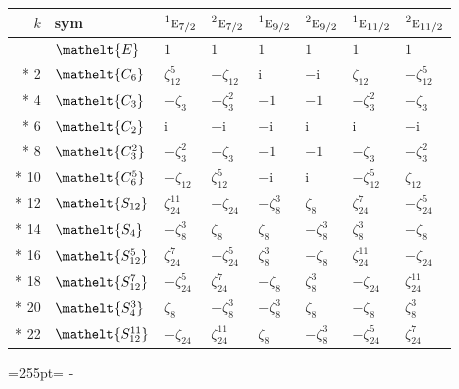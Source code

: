 \documentclass[10pt,a4paper]{article}
\newcommand{\needspace}[1]{\par\penalty-100\begingroup\dimen0=#1\relax\dimen2=\pagegoal
  \advance\dimen2-\pagetotal\ifdim\dimen0>\dimen2\relax\ifdim\dimen2>0pt\vfil\break\fi\fi
  \endgroup}
\numberwithin{equation}{section}
\newcommand{\eltfont}[1]{{\let\sigma\eltsigma\mathelt{#1}}}
\newcommand{\irr}[1]{\text{\normalfont\scshape #1}}
\newcommand{\conjpair}[1]{{}^{#1}}
\newcommand{\cls}[1]{\eltfont{#1}}
\newcommand{\iunit}{\mathrm{i}}
\newcommand{\rootunity}[1]{\zeta_{#1}}
\begin{document}
{\small\setlength{\tabcolsep}{4pt}
\begin{longtable}{@{}rlllllll@{}}\toprule
$k$ & sym & $\conjpair{1}\irr{e}_{7/2}$ & $\conjpair{2}\irr{e}_{7/2}$ & $\conjpair{1}\irr{e}_{9/2}$ & $\conjpair{2}\irr{e}_{9/2}$ & $\conjpair{1}\irr{e}_{11/2}$ & $\conjpair{2}\irr{e}_{11/2}$\\\midrule\endhead
\bottomrule\endfoot\endlastfoot
0 & $\cls{E}$ & $1$ & $1$ & $1$ & $1$ & $1$ & $1$\\*
2 & $\cls{C_{6}}$ & $\rootunity{12}^{5}$ & $-\rootunity{12}$ & $\iunit{}$ & $-\iunit{}$ & $\rootunity{12}$ & $-\rootunity{12}^{5}$\\*
4 & $\cls{C_{3}}$ & $-\rootunity{3}$ & $-\rootunity{3}^{2}$ & $-1$ & $-1$ & $-\rootunity{3}^{2}$ & $-\rootunity{3}$\\*
6 & $\cls{C_{2}}$ & $\iunit{}$ & $-\iunit{}$ & $-\iunit{}$ & $\iunit{}$ & $\iunit{}$ & $-\iunit{}$\\*
8 & $\cls{C_{3}^{2}}$ & $-\rootunity{3}^{2}$ & $-\rootunity{3}$ & $-1$ & $-1$ & $-\rootunity{3}$ & $-\rootunity{3}^{2}$\\*
10 & $\cls{C_{6}^{5}}$ & $-\rootunity{12}$ & $\rootunity{12}^{5}$ & $-\iunit{}$ & $\iunit{}$ & $-\rootunity{12}^{5}$ & $\rootunity{12}$\\*
12 & $\cls{S_{12}}$ & $\rootunity{24}^{11}$ & $-\rootunity{24}$ & $-\rootunity{8}^{3}$ & $\rootunity{8}$ & $\rootunity{24}^{7}$ & $-\rootunity{24}^{5}$\\*
14 & $\cls{S_{4}}$ & $-\rootunity{8}^{3}$ & $\rootunity{8}$ & $\rootunity{8}$ & $-\rootunity{8}^{3}$ & $\rootunity{8}^{3}$ & $-\rootunity{8}$\\*
16 & $\cls{S_{12}^{5}}$ & $\rootunity{24}^{7}$ & $-\rootunity{24}^{5}$ & $\rootunity{8}^{3}$ & $-\rootunity{8}$ & $\rootunity{24}^{11}$ & $-\rootunity{24}$\\*
18 & $\cls{S_{12}^{7}}$ & $-\rootunity{24}^{5}$ & $\rootunity{24}^{7}$ & $-\rootunity{8}$ & $\rootunity{8}^{3}$ & $-\rootunity{24}$ & $\rootunity{24}^{11}$\\*
20 & $\cls{S_{4}^{3}}$ & $\rootunity{8}$ & $-\rootunity{8}^{3}$ & $-\rootunity{8}^{3}$ & $\rootunity{8}$ & $-\rootunity{8}$ & $\rootunity{8}^{3}$\\*
22 & $\cls{S_{12}^{11}}$ & $-\rootunity{24}$ & $\rootunity{24}^{11}$ & $\rootunity{8}$ & $-\rootunity{8}^{3}$ & $-\rootunity{24}^{5}$ & $\rootunity{24}^{7}$\\
\bottomrule\end{longtable}}
\needspace{255pt}
\end{document}
